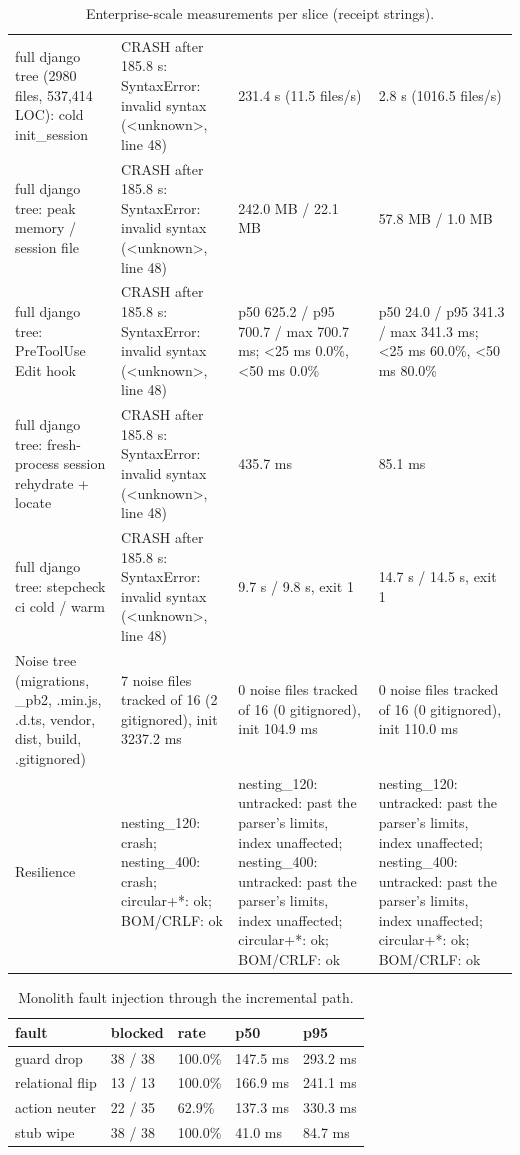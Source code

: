 \documentclass{article}
\begin{document}
\begin{table}[h]
\begin{tabular}{llll}
full django tree (2980 files, 537,414 LOC): cold init\_session & CRASH after 185.8 s: SyntaxError: invalid syntax (<unknown>, line 48) & 231.4 s (11.5 files/s) & 2.8 s (1016.5 files/s) \\
full django tree: peak memory / session file & CRASH after 185.8 s: SyntaxError: invalid syntax (<unknown>, line 48) & 242.0 MB / 22.1 MB & 57.8 MB / 1.0 MB \\
full django tree: PreToolUse Edit hook & CRASH after 185.8 s: SyntaxError: invalid syntax (<unknown>, line 48) & p50 625.2 / p95 700.7 / max 700.7 ms; <25 ms 0.0\%, <50 ms 0.0\% & p50 24.0 / p95 341.3 / max 341.3 ms; <25 ms 60.0\%, <50 ms 80.0\% \\
full django tree: fresh-process session rehydrate + locate & CRASH after 185.8 s: SyntaxError: invalid syntax (<unknown>, line 48) & 435.7 ms & 85.1 ms \\
full django tree: stepcheck ci cold / warm & CRASH after 185.8 s: SyntaxError: invalid syntax (<unknown>, line 48) & 9.7 s / 9.8 s, exit 1 & 14.7 s / 14.5 s, exit 1 \\
Noise tree (migrations, \_pb2, .min.js, .d.ts, vendor, dist, build, .gitignored) & 7 noise files tracked of 16 (2 gitignored), init 3237.2 ms & 0 noise files tracked of 16 (0 gitignored), init 104.9 ms & 0 noise files tracked of 16 (0 gitignored), init 110.0 ms \\
Resilience & nesting\_120: crash; nesting\_400: crash; circular+*: ok; BOM/CRLF: ok & nesting\_120: untracked: past the parser's limits, index unaffected; nesting\_400: untracked: past the parser's limits, index unaffected; circular+*: ok; BOM/CRLF: ok & nesting\_120: untracked: past the parser's limits, index unaffected; nesting\_400: untracked: past the parser's limits, index unaffected; circular+*: ok; BOM/CRLF: ok \\
\bottomrule
\end{tabular}
\caption{Enterprise-scale measurements per slice (receipt strings).}
\label{tab:enterprise}
\end{table}
\begin{table}[h]
\centering
\begin{tabular}{lllll}
\toprule
fault & blocked & rate & p50 & p95 \\
\midrule
guard drop & 38 / 38 & 100.0\% & 147.5 ms & 293.2 ms \\
relational flip & 13 / 13 & 100.0\% & 166.9 ms & 241.1 ms \\
action neuter & 22 / 35 & 62.9\% & 137.3 ms & 330.3 ms \\
stub wipe & 38 / 38 & 100.0\% & 41.0 ms & 84.7 ms \\
\bottomrule
\end{tabular}
\caption{Monolith fault injection through the incremental path.}
\label{tab:faults}
\end{table}
\end{document}
